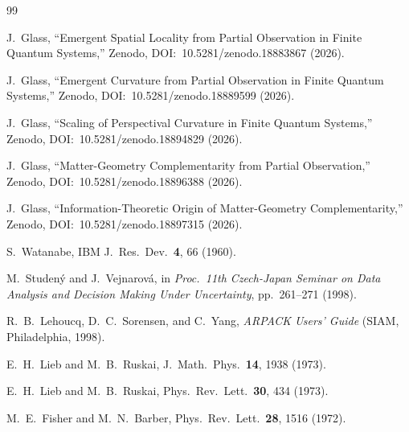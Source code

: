 \documentclass[aps,pra,twocolumn,superscriptaddress,floatfix]{revtex4-2}
\begin{document}
\begin{thebibliography}{99}

J.~Glass, ``Emergent Spatial Locality from Partial Observation
in Finite Quantum Systems,''
Zenodo, DOI:~10.5281/zenodo.18883867 (2026).

J.~Glass, ``Emergent Curvature from Partial Observation
in Finite Quantum Systems,''
Zenodo, DOI:~10.5281/zenodo.18889599 (2026).

J.~Glass, ``Scaling of Perspectival Curvature in Finite
Quantum Systems,''
Zenodo, DOI:~10.5281/zenodo.18894829 (2026).

J.~Glass, ``Matter-Geometry Complementarity from Partial
Observation,''
Zenodo, DOI:~10.5281/zenodo.18896388 (2026).

J.~Glass, ``Information-Theoretic Origin of Matter-Geometry
Complementarity,''
Zenodo, DOI:~10.5281/zenodo.18897315 (2026).

S.~Watanabe, IBM J.\ Res.\ Dev.\ \textbf{4}, 66 (1960).

M.~Studen\'y and J.~Vejnarov\'a, in \textit{Proc.\ 11th Czech-Japan Seminar on Data Analysis and Decision Making Under Uncertainty}, pp.\ 261--271 (1998).

R.~B.~Lehoucq, D.~C.~Sorensen, and C.~Yang, \textit{ARPACK Users' Guide} (SIAM, Philadelphia, 1998).

E.~H.~Lieb and M.~B.~Ruskai, J.\ Math.\ Phys.\ \textbf{14}, 1938 (1973).

E.~H.~Lieb and M.~B.~Ruskai, Phys.\ Rev.\ Lett.\ \textbf{30}, 434 (1973).

M.~E.~Fisher and M.~N.~Barber, Phys.\ Rev.\ Lett.\ \textbf{28}, 1516 (1972).

\end{thebibliography}
\end{document}
